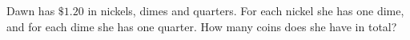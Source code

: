 Dawn has $\$1.20$ in nickels, dimes and quarters. For each nickel she has one dime, and for each dime she has one quarter. How many coins does she have in total?
